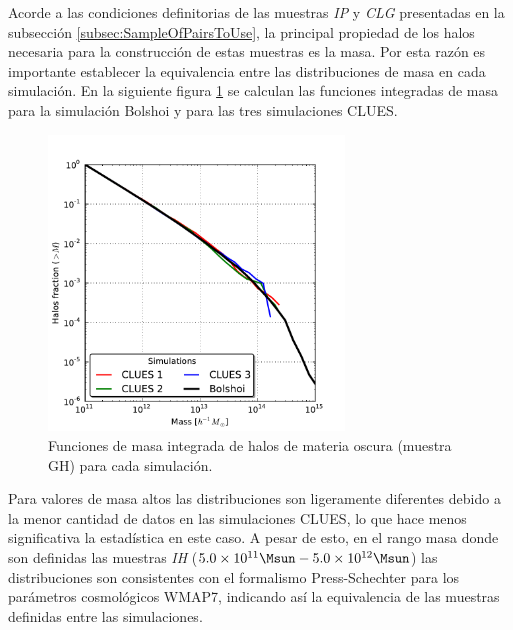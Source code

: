 Acorde a las condiciones definitorias de las muestras \textit{IP} y 
\textit{CLG} presentadas en la subsección \ref{subsec:SampleOfPairsToUse}, 
la principal propiedad de los halos necesaria para la construcción de estas 
muestras es la masa. Por esta razón es importante establecer la equivalencia 
entre las distribuciones de masa en cada simulación. En la siguiente figura 
\ref{fig:IMF} se calculan las funciones integradas de masa para la simulación 
Bolshoi y para las tres simulaciones CLUES.


\begin{figure}[htbp]
	\centering
	\includegraphics[width=0.70\textwidth]
	{./figures/4_results/Halos_IMF.pdf}
	
	\caption{\small{Funciones de masa integrada de halos de materia oscura 
	(muestra GH) para cada simulación.}}
	\label{fig:IMF}
\end{figure}


Para valores de masa altos las distribuciones son ligeramente diferentes 
debido a la menor cantidad de datos en las simulaciones CLUES, lo que hace
menos significativa la estadística en este caso. A pesar de esto, en el
rango masa donde son definidas las muestras \textit{IH} 
($5.0 \times 10^{11}\Msun - 5.0\times 10 ^{12}\Msun$) las distribuciones 
son consistentes con el formalismo Press-Schechter \cite{press1974} para 
los parámetros cosmológicos WMAP7, indicando así la equivalencia de las 
muestras definidas entre las simulaciones.


